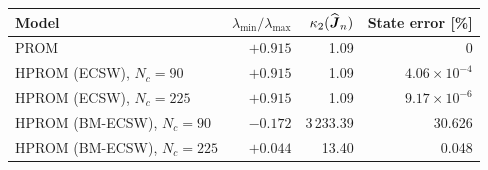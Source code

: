 \begin{tabular}{@{}lrrr@{}}
\toprule
Model & $\lambda_{\min}/\lambda_{\max}$ & $\kappa_2(\widehat{\boldsymbol{J}}_n)$ & State error [\%]\\
\midrule
PROM & $+0.915$ & 1.09 & 0\\
HPROM (ECSW), $N_c=90$ & $+0.915$ & 1.09 & $4.06\times10^{-4}$\\
HPROM (ECSW), $N_c=225$ & $+0.915$ & 1.09 & $9.17\times10^{-6}$\\
HPROM (BM-ECSW), $N_c=90$ & $-0.172$ & 3\,233.39 & 30.626\\
HPROM (BM-ECSW), $N_c=225$ & $+0.044$ & 13.40 & 0.048\\
\bottomrule
\end{tabular}
